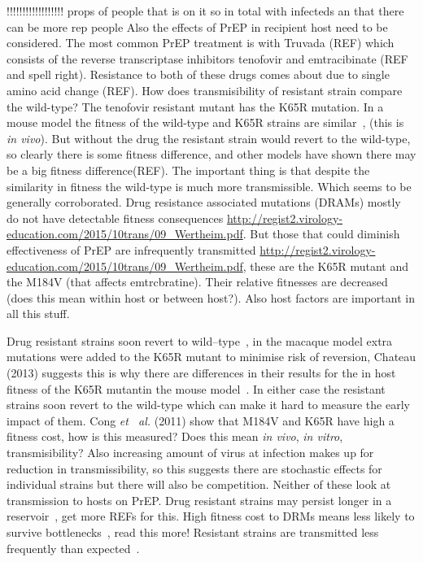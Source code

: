 \documentclass[DIV=15]{scrartcl}
\begin{document}
!!!!!!!!!!!!!!!!!! props of people that is on it so in total  with infecteds an that there can be more rep people
\iffalse
Also the effects of PrEP in recipient host need to be considered. The most common PrEP treatment is with Truvada (REF) which consists of the reverse transcriptase inhibitors tenofovir and emtracibinate (REF and spell right). Resistance to both of these drugs comes about due to single amino acid change (REF). How does transmisibility of resistant strain compare the wild-type? The tenofovir resistant mutant has the K65R mutation. In a mouse model the fitness of the wild-type and K65R strains are similar~\cite{chateau2013}, (this is   \textit{in vivo}). But without the drug the resistant strain would revert to the wild-type, so clearly there is some fitness difference, and other models have shown there may be a big fitness difference(REF). The important thing is that despite the similarity in fitness the wild-type is much more transmissible. Which seems to  be generally corroborated. Drug resistance associated mutations (DRAMs) mostly do not have detectable fitness consequences 
 \url{http://regist2.virology-education.com/2015/10trans/09_Wertheim.pdf}. But those that could diminish effectiveness of PrEP are infrequently transmitted \url{http://regist2.virology-education.com/2015/10trans/09_Wertheim.pdf}, these are the K65R mutant and the M184V (that affects emtrcbratine). Their relative fitnesses are decreased (does this mean within host or between host?). Also  host factors are important in all this stuff.


Drug resistant strains soon revert to wild--type~\cite{cong2011},  in the macaque model extra mutations were added to the K65R mutant  to minimise risk  of reversion, Chateau (2013) suggests this is why there  are differences in their results for the in host fitness of the K65R mutantin the mouse model~\cite{chateau2013}. In either case the resistant strains soon revert to the wild-type which can make it hard to measure the early  impact of them. Cong \textit{et \ al.} (2011) show that  M184V and K65R have high a fitness cost, how is this measured? Does this mean \textit{in vivo}, \textit{in vitro}, transmisibility? Also increasing amount of virus at infection makes up for reduction in transmissibility, so this suggests there are stochastic effects for individual strains but there will also be competition. Neither of these look at transmission to hosts on PrEP. Drug resistant strains may persist longer in a reservoir~\cite{chateau2013}, get more REFs for this.
High fitness cost to DRMs means less likely to survive bottlenecks~\cite{wagner2012}, read this more! Resistant strains are transmitted  less frequently than expected~\cite{leighbrown2003}.
\end{document}
